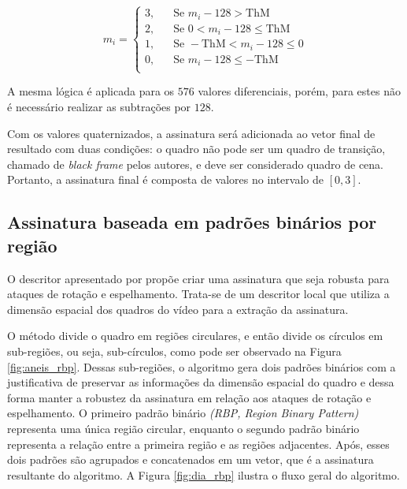 \begin{equation}
	\label{eq:mediaquart}
	m_i = 
     \begin{cases}
       \text{3,} &\quad\text{Se } m_i-128 > \text{ThM} \\
       \text{2,} &\quad\text{Se } 0 < m_i - 128 \le \text{ThM} \\
       \text{1,} &\quad\text{Se } -\text{ThM} < m_i - 128 \le 0 \\
       \text{0,} &\quad\text{Se } m_i - 128 \le -\text{ThM} \\ 
     \end{cases}
\end{equation}

A mesma lógica é aplicada para os $576$ valores diferenciais, porém, para estes não é necessário realizar as subtrações por $128$.

Com os valores quaternizados, a assinatura será adicionada ao vetor final de resultado com duas condições: o quadro não pode ser um quadro de transição, chamado de \textit{black frame} pelos autores, e deve ser considerado quadro de cena. Portanto, a assinatura final é composta de valores no intervalo de $\left[0,3\right]$.

%
\subsection{Assinatura baseada em padrões binários por região}


O descritor apresentado por  propõe criar uma assinatura que seja robusta para ataques de rotação e espelhamento. Trata-se de um descritor local que utiliza a dimensão espacial dos quadros do vídeo para a extração da assinatura. 

O método divide o quadro em regiões circulares, e então divide os círculos em sub-regiões, ou seja, sub-círculos, como pode ser observado na Figura \ref{fig:aneis_rbp}. Dessas sub-regiões, o algoritmo gera dois padrões binários com a justificativa de preservar as informações da dimensão espacial do quadro e dessa forma manter a robustez da assinatura em relação aos ataques de rotação e espelhamento. O  primeiro padrão binário  \textit{(RBP, Region Binary Pattern)} representa uma única região circular, enquanto o segundo padrão binário representa a relação entre a primeira região e as regiões adjacentes. Após, esses dois padrões são agrupados e concatenados em um vetor, que é a assinatura resultante do algoritmo. A Figura \ref{fig:dia_rbp} ilustra o fluxo geral do algoritmo.

